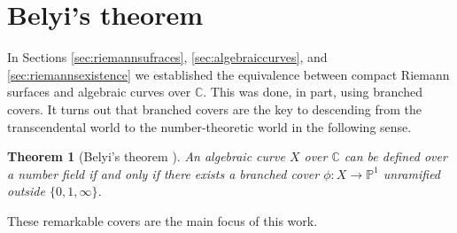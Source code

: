 \documentclass{dcthesis}
\newcommand{\PP}{\mathbb P}
\newcommand{\CC}{\mathbb C}
\newtheorem{theorem}[prop]{Theorem}
\theoremstyle{definition}
\theoremstyle{remark}
\numberwithin{equation}{section}
\numberwithin{figure}{section}
\begin{document}
{  \section{Belyi's theorem}{\label{sec:belyistheorem}
    In Sections
    \ref{sec:riemannsufraces}, \ref{sec:algebraiccurves},
    and \ref{sec:riemannsexistence}
    we established the equivalence between
    compact Riemann surfaces and algebraic curves over $\CC$.
    This was done, in part,
    using branched covers.
    It turns out that branched covers are the key
    to descending from the transcendental world to
    the number-theoretic world in the following sense.
    \begin{theorem}[Belyi's theorem \cite{belyi}]\label{thm:belyistheorem}
      An algebraic curve $X$ over $\CC$ can be defined over a number field
      if and only if there exists a branched cover
      $\phi\colon X\to\PP^1$ unramified outside
      $\{0,1,\infty\}$.
    \end{theorem}
    These remarkable covers are the main focus of this work.
  }
}
\end{document}
